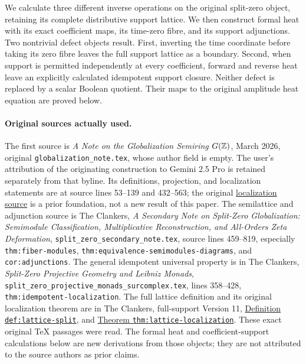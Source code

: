 

We calculate three different inverse operations on the original
split-zero object, retaining its complete distributive support lattice.
We then construct formal heat with its exact coefficient maps, its
time-zero fibre, and its support adjunctions.  Two nontrivial defect
objects result.  First, inverting the time coordinate before taking
its zero fibre leaves the full support lattice as a boundary.
Second, when support is permitted independently at every coefficient,
forward and reverse heat leave an explicitly calculated idempotent
support closure.  Neither defect is replaced by a scalar Boolean
quotient.  Their maps to the original amplitude heat equation are
proved below.

\paragraph{Original sources actually used.}
The first source is \emph{A Note on the Globalization Semiring
$G(\mathbb Z)$}, March 2026, original \texttt{globalization\_note.tex},
whose author field is empty.  The user's attribution of the originating
construction to Gemini 2.5 Pro is retained separately from that
byline.  Its definitions, projection, and localization statements are
at source lines 53--139 and 432--563; the original
\href{https://github.com/KokunoYumeto/zeta-function-research-reader/blob/d2f0020a7c446f429682925c1c682d99ba86a4cc/workbenches/splitzero-tandem/foundations/globalization-semiring/globalization_note.tex#L432}{localization source}
is a prior foundation, not a new result of this paper.
The semilattice and adjunction source is The Clankers,
\emph{A Secondary Note on Split-Zero Globalization:
Semimodule Classification, Multiplicative Reconstruction, and
All-Orders Zeta Deformation},
\texttt{split\_zero\_secondary\_note.tex},
source lines 459--819, especially
\texttt{thm:fiber-modules}, \texttt{thm:equivalence-semimodules-diagrams},
and \texttt{cor:adjunctions}.
The general idempotent universal property is in The Clankers,
\emph{Split-Zero Projective Geometry and Leibniz Monads},
\texttt{split\_zero\_projective\_monads\_surcomplex.tex},
lines 358--428, \texttt{thm:idempotent-localization}.
The full lattice definition and its original localization theorem are
in The Clankers, full-support Version 11,
\href{https://github.com/KokunoYumeto/zeta-function-research-reader/blob/a2851f9eb352e7e4376bc629de86fa4ed9c1c434/workbenches/splitzero-tandem/foundations/split-support-geometry-v11/split_support_geometry_arithmetic_curve_v11.tex#L1228}{Definition \texttt{def:lattice-split}},
and
\href{https://github.com/KokunoYumeto/zeta-function-research-reader/blob/a2851f9eb352e7e4376bc629de86fa4ed9c1c434/workbenches/splitzero-tandem/foundations/split-support-geometry-v11/split_support_geometry_arithmetic_curve_v11.tex#L1456}{Theorem \texttt{thm:lattice-localization}}.
These exact original TeX passages were read. The formal heat and
coefficient-support calculations below are new derivations from those
objects; they are not attributed to the source authors as prior claims.

